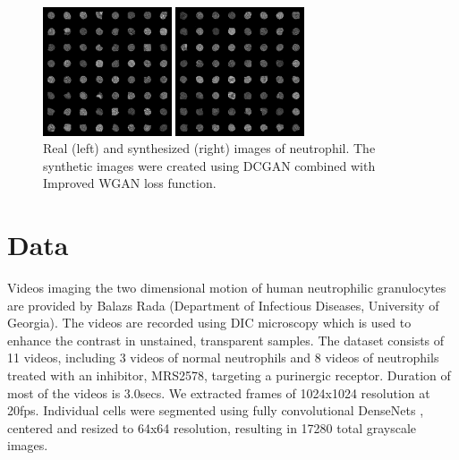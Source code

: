 \documentclass{article}
\newcommand{\squeezeup}{\vspace{-2.5mm}}
\begin{document}
\begin{figure} [htb]
\begin{minipage}[b]{0.48\linewidth}
  \centering
  \centerline{\includegraphics[width=3.8cm]{real_samples}}
  \vspace{-0.3cm}
\end{minipage}
\hfill
\begin{minipage}[b]{0.48\linewidth}
  \centering
  \centerline{\includegraphics[width=3.8cm]{fake_samples_5000}}
  \vspace{-0.3cm}
\end{minipage}
\caption{Real (left) and synthesized (right) images of neutrophil. The synthetic images were created using DCGAN combined with Improved WGAN loss function.
}
\label{fig:res2}
\end{figure}
\squeezeup
\squeezeup
\vspace{-5.5mm}
\section{Data}
\label{sec:data}
\squeezeup
\vspace{-2.5mm}
Videos imaging the two dimensional motion of human neutrophilic granulocytes are provided by Balazs Rada (Department of Infectious Diseases, University of Georgia). The videos are recorded using DIC microscopy which is used to
enhance the contrast in unstained, transparent samples. The dataset consists of 11 videos, including 3 videos of normal neutrophils and 8 videos of neutrophils treated with an inhibitor, MRS2578, targeting a purinergic receptor. Duration
of most of the videos is 3.0secs. We extracted frames of 1024x1024 resolution at 20fps. Individual cells were segmented using fully convolutional DenseNets \cite{DBLP:journals/corr/JegouDVRB16}, centered and resized to 64x64 resolution, resulting in 17280 total grayscale images. \par
\squeezeup
\squeezeup
\vspace{-2.5mm}
\end{document}
